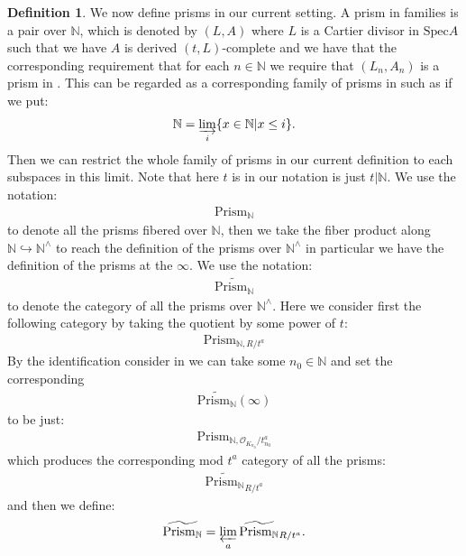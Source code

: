 \documentclass[12pt]{article}
\theoremstyle{definition}
\newtheorem{definition}{Definition}
\begin{document}
\begin{definition}
We now define prisms in our current setting. A prism in families is a pair over $\mathbb{N}$, which is denoted by $(L,A)$ where $L$ is a Cartier divisor in $\mathrm{Spec}A$ such that we have $A$ is derived $(t,L)$-complete and we have that the corresponding requirement that for each $n\in \mathbb{N}$ we require that $(L_n,A_n)$ is a prism in \cite{2BS}. This can be regarded as a corresponding family of prisms in \cite{2BS} such as if we put:
\begin{align}
\mathbb{N} = \varinjlim_i \{x\in \mathbb{N}|x\leq i\}.
\end{align} 
Then we can restrict the whole family of prisms in our current definition to each subspaces in this limit. Note that here $t$ is in our notation is just $t|\mathbb{N}$. We use the notation:
\begin{align}
\mathrm{Prism}_\mathbb{N}
\end{align}
to denote all the prisms fibered over $\mathbb{N}$, then we take the fiber product along $\mathbb{N}\hookrightarrow \mathbb{N}^\wedge$ to reach the definition of the prisms over $\mathbb{N}^\wedge$ in particular we have the definition of the prisms at the $\infty$. We use the notation:
\begin{align}
\widetilde{\mathrm{Prism}_\mathbb{N}}
\end{align}
to denote the category of all the prisms over $\mathbb{N}^\wedge$. Here we consider first the following category by taking the quotient by some power of $t$:
\begin{align}
\mathrm{Prism}_{\mathbb{N},R/t^a}
\end{align}
By the identification consider in \cite{2LH} we can take some $n_0\in \mathbb{N}$ and set the corresponding 
\begin{align}
\widetilde{\mathrm{Prism}_\mathbb{N}}(\infty)
\end{align}
to be just:
\begin{align}
\mathrm{Prism}_{\mathbb{N},\mathcal{O}_{K_{n_0}}/t_{n_0}^a}
\end{align}
which produces the corresponding mod $t^a$ category of all the prisms:
\begin{align}
\widetilde{\mathrm{Prism}_\mathbb{N}}_{R/t^a}
\end{align}
and then we define:
\begin{align}
\widetilde{\mathrm{Prism}_\mathbb{N}} = \varprojlim_a \widetilde{\mathrm{Prism}_\mathbb{N}}_{R/t^a}.
\end{align}
\end{definition}
\end{document}
